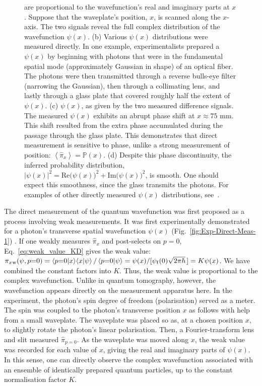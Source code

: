 \documentclass[%
 reprint,
superscriptaddress,
nofootinbib,
bibnotes,
 amsmath,amssymb,
 aps,
]{revtex4-1}
\theoremstyle{plain}
\newcommand{\LParen}{ \bm{(} }
\newcommand{\RParen}{ \bm{)} }
\begin{document}
\begin{figure}
{are proportional to the wavefunction's real and imaginary parts at $x$. Suppose that the waveplate's position, $x$, is scanned along the $x$-axis. The two signals reveal the full complex distribution of the wavefunction $\psi(x)$. (b) Various $\psi(x)$ distributions were measured directly. In one example, experimentalists prepared a $\psi(x)$ by beginning with photons that were in the fundamental spatial mode (approximately Gaussian in shape) of an optical fiber. The photons were then transmitted through a reverse bulls-eye filter (narrowing the Gaussian), then through a collimating lens, and lastly through a glass plate that covered roughly half the extent of $\psi(x)$. (c) $\psi(x)$, as given by the two measured difference signals. The measured $\psi(x)$ exhibits an abrupt phase shift at $x\approx75$ mm. This shift resulted from the extra phase accumulated during the passage through the glass plate. This demonstrates that direct measurement is sensitive to phase, unlike a strong measurement of position:
$\left\langle \hat{\pi}_{x}\right\rangle =\mathbb{P}(x)$. 
(d) Despite this phase discontinuity, the inferred probability distribution, $\left|\psi(x)\right|^{2}=\mathrm{Re} \LParen \psi(x) \RParen^{2}
+\mathrm{Im} \LParen \psi(x) \RParen^{2}$,
is smooth. One should expect this smoothness, since the glass transmits the photons. For examples of other directly measured $\psi(x)$ distributions, see~\cite{Lundeen2011}.}
\end{figure}

The direct measurement of the quantum wavefunction was first
proposed as a process involving weak measurements. It was first experimentally demonstrated for a photon's transverse spatial wavefunction $\psi(x)$ (Fig.~\ref{fig:Exp-Direct-Meas-1}) 
\cite{Lundeen2011}. If one weakly measures $\hat{\pi}_{x}$ and  post-selects on $p=0$, Eq.~\eqref{eq:weak_value_KD} gives the weak value:  $\pi_{x}{}_{\mathrm{w}} (\psi, p{=}0) =\braket{p{=}0|x}\!\braket{x|\psi}/\braket{p{=}0|\psi}
=\psi(x)/[\psi_{\mathrm{f}}(0)\sqrt{2\pi\hbar} \, ]
=K\psi(x)$. 
We have combined the constant factors into $K$. Thus, the weak value is proportional to the complex wavefunction. Unlike in quantum tomography, however, the wavefunction appears directly on the measurement apparatus here. 
In the experiment, the photon's spin degree of freedom (polarisation) served as a meter. The spin was coupled to the photon's transverse position $x$ as follows with help from a small waveplate. The waveplate was placed so as, at a chosen position $x$, to slightly rotate the photon's linear polarisation. Then, a Fourier-transform lens and slit measured $\hat{\pi}_{p=0}$. As the waveplate was moved along $x$, the weak value was recorded for each value of $x$, giving the real and imaginary parts of $\psi(x)$. In this sense, one can directly observe the complex wavefunction associated with an  ensemble of identically prepared  quantum particles, up to the constant normalisation factor $K$.
\end{document}
